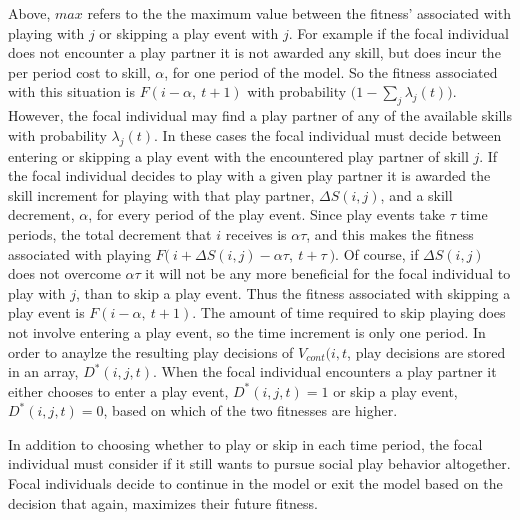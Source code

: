 \documentclass[12pt,letterpaper]{article}
\begin{document}
      Above, $max$ refers to the the maximum value between the fitness' associated with playing with $j$ or skipping a play event with $j$.
      For example if the focal individual does not encounter a play partner it is not awarded any skill, but does incur the per period cost to skill, $\alpha$, for one period of the model. 
      So the fitness associated with this situation is $F(i-\alpha,~t+1)$ with probability $\bigl(1-\sum_j \lambda_{j}(t) \bigr)$.     %
      However, the focal individual may find a play partner of any of the available skills with probability $\lambda_j(t)$.  
      In these cases the focal individual must decide between entering or skipping a play event with the encountered play partner of skill $j$. 
      If the focal individual decides to play with a given play partner it is awarded the skill increment for playing with that play partner, $\Delta S(i,j)$, and a skill decrement, $\alpha$, for every period of the play event.
      Since play events take $\tau$ time periods, the total decrement that $i$ receives is $\alpha \tau$, and this makes the fitness associated with playing $F\bigl(~ i + \Delta S(i,j) - \alpha \tau,~t+\tau ~\bigr)$.
      Of course, if $\Delta S(i,j)$ does not overcome $\alpha \tau$ it will not be any more beneficial for the focal individual to play with $j$, than to skip a play event.
      Thus the fitness associated with skipping a play event is $F(i-\alpha,~t+1)$.
      The amount of time required to skip playing does not involve entering a play event, so the time increment is only one period. %
      In order to anaylze the resulting play decisions of $V_{cont}(i,t$, play decisions are stored in an array, $D^*(i,j,t)$.
      When the focal individual encounters a play partner it either chooses to enter a play event, $D^*(i,j,t)=1$  or skip a play event, $D^*(i,j,t)=0$, based on which of the two fitnesses are higher. 

      In addition to choosing whether to play or skip in each time period, the focal individual must consider if it still wants to pursue social play behavior altogether. %
      Focal individuals decide to continue in the model or exit the model based on the decision that again, maximizes their future fitness.
      
\end{document}
